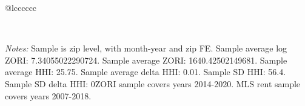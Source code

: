 \begin{table}[H]
{\begin{tabular}{@{\extracolsep{5pt}}lcccccc}
 \hline  

 \hline \\[-1.8ex]  

  {\parbox[t]{\textwidth}{ \textit{Notes:} Sample is zip level, with month-year and zip FE. Sample average log ZORI: 7.34055022290724. Sample average ZORI: 1640.42502149681. Sample average HHI: 25.75. Sample average delta HHI: 0.01. Sample SD HHI: 56.4. Sample SD delta HHI: 0ZORI sample covers years 2014-2020. MLS rent sample covers years 2007-2018.}} \\ 

 \end{tabular}}  

 \end{table}  

